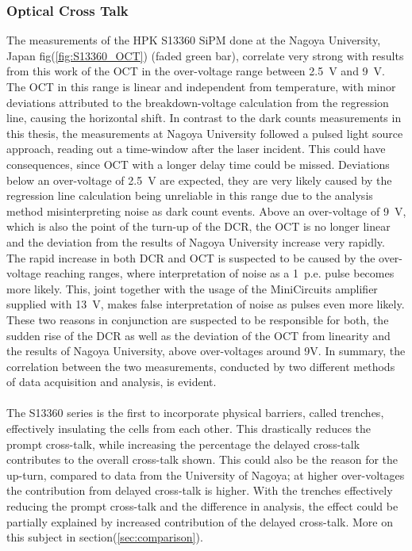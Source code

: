 \documentclass[12pt,article,type=msc,colorback,accentcolor=tud9c]{tudthesis}
\begin{document}
\subsubsection{Optical Cross Talk}

The measurements of the HPK S13360 SiPM done at the Nagoya University\cite{Hiro}, Japan fig(\ref{fig:S13360_OCT}) (faded green bar), correlate very strong with results from this work of the OCT in the over-voltage range between 2.5~V and 9~V. The OCT in this range is linear and independent from temperature, with minor deviations attributed to the breakdown-voltage calculation from the regression line, causing the horizontal shift. In contrast to the dark counts measurements in this thesis, the measurements at Nagoya University followed a pulsed light source approach, reading out a time-window after the laser incident. This could have consequences, since OCT with a longer delay time could be missed. Deviations below an over-voltage of 2.5~V are expected, they are very likely caused by the regression line calculation being unreliable in this range due to the analysis method misinterpreting noise as dark count events. Above an over-voltage of 9~V, which is also the point of the turn-up of the DCR, the OCT is no longer linear and the deviation from the results of Nagoya University increase very rapidly. The rapid increase in both DCR and OCT is suspected to be caused by the over-voltage reaching ranges, where interpretation of noise as a 1~p.e. pulse becomes more likely. This, joint together with the usage of the MiniCircuits amplifier supplied with 13~V, makes false interpretation of noise as pulses even more likely. These two reasons in conjunction are suspected to be responsible for both, the sudden rise of the DCR as well as the deviation of the OCT from linearity and the results of Nagoya University, above over-voltages around 9V. In summary, the correlation between the two measurements, conducted by two different methods of data acquisition and analysis, is evident.\\\\

The S13360 series is the first to incorporate physical barriers, called trenches, effectively insulating the cells from each other. This drastically reduces the prompt cross-talk, while increasing the percentage the delayed cross-talk contributes to the overall cross-talk shown. This could also be the reason for the up-turn, compared to data from the University of Nagoya; at higher over-voltages the contribution from delayed cross-talk is higher\cite{DelayedOCT}. With the trenches effectively reducing the prompt cross-talk and the difference in analysis, the effect could be partially explained by increased contribution of the delayed cross-talk. More on this subject in section(\ref{sec:comparison}).
\end{document}
